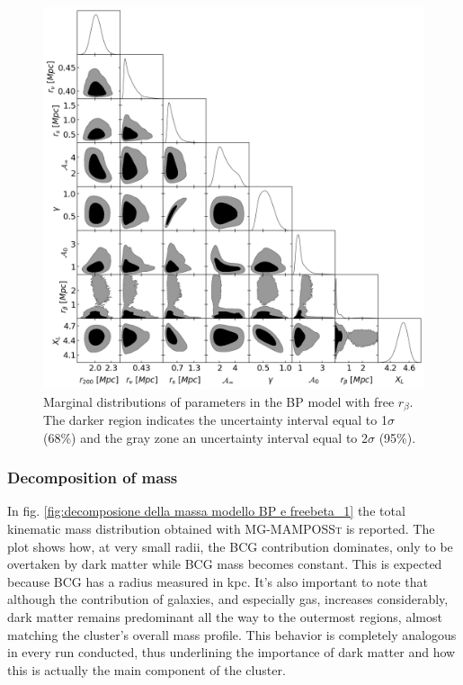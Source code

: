 \begin{figure}[h!]
    \centering
    \includegraphics[width=0.9\linewidth]{Images/Chapter4/BP freebeta=1/distribution BP freebeta=1.png}
    \caption[Marginal distributions of parameters in the BP model with free $r_\beta$]{Marginal distributions of parameters in the BP model with free $r_\beta$. The darker region indicates the uncertainty interval equal to 1$\sigma$ (68\;\%) and the gray zone an uncertainty interval equal to 2$\sigma$ (95\;\%).}
    \label{fig:distribuzioni marginali dei parametri modello BP e freebeta_1}
\end{figure}

\clearpage

\subsubsection{Decomposition of mass}
In fig. \ref{fig:decomposione della massa modello BP e freebeta_1} the total kinematic mass distribution obtained with \textsc{MG-MAMPOSSt} is reported. The plot shows how, at very small radii, the BCG contribution dominates, only to be overtaken by dark matter while BCG mass becomes constant. This is expected because BCG has a radius measured in kpc. It's also important to note that although the contribution of galaxies, and especially gas, increases considerably, dark matter remains predominant all the way to the outermost regions, almost matching the cluster's overall mass profile. This behavior is completely analogous in every run conducted, thus underlining the importance of dark matter and how this is actually the main component of the cluster.


